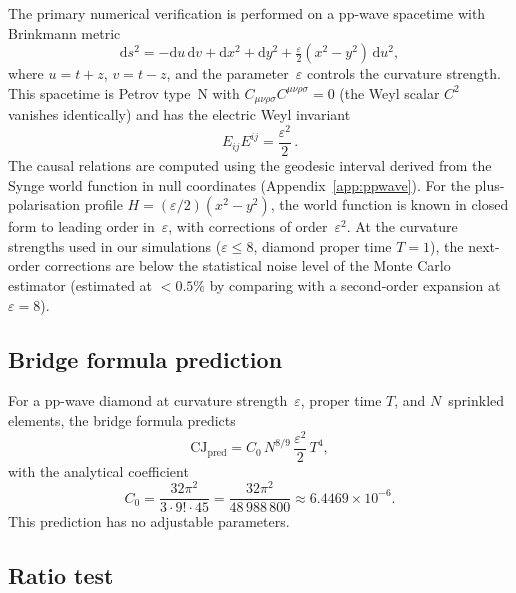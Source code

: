 \documentclass[12pt,a4paper]{article}
\theoremstyle{plain}
\theoremstyle{definition}
\theoremstyle{remark}
\newcommand{\dd}{\mathrm{d}}
\newcommand{\Esq}{E_{ij}E^{ij}}
\newcommand{\CJ}{\mathrm{CJ}}
\begin{document}
The primary numerical verification is performed on a pp-wave
spacetime with Brinkmann metric
\begin{equation}\label{eq:ppwave}
  \dd s^2 = -\dd u\,\dd v + \dd x^2 + \dd y^2
  + \tfrac{\varepsilon}{2}(x^2 - y^2)\,\dd u^2,
\end{equation}
where $u = t+z$, $v = t-z$, and the parameter~$\varepsilon$
controls the curvature strength.  This spacetime is Petrov
type~N with $C_{\mu\nu\rho\sigma}C^{\mu\nu\rho\sigma} = 0$
(the Weyl scalar $C^2$ vanishes identically) and has the
electric Weyl invariant~\cite{Wang:2019}
\begin{equation}\label{eq:E2ppw}
  \Esq = \frac{\varepsilon^2}{2}\,.
\end{equation}
The causal relations are computed using the geodesic interval
derived from the Synge world function in null coordinates
(Appendix~\ref{app:ppwave}).  For the plus-polarisation profile
$H = (\varepsilon/2)(x^2 - y^2)$, the world function is known
in closed form to leading order in~$\varepsilon$, with corrections
of order~$\varepsilon^2$.  At the curvature strengths used in our
simulations ($\varepsilon \leq 8$, diamond proper time $T = 1$),
the next-order corrections are below the statistical noise level
of the Monte Carlo estimator (estimated at $< 0.5\%$ by comparing
with a second-order expansion at $\varepsilon = 8$).

\subsection{Bridge formula prediction}
\label{sec:prediction}

For a pp-wave diamond at curvature strength~$\varepsilon$, proper
time $T$, and $N$~sprinkled elements, the bridge formula
predicts
\begin{equation}\label{eq:CJ-pred}
  \CJ_{\mathrm{pred}} = C_0\, N^{8/9}\, \frac{\varepsilon^2}{2}\, T^4,
\end{equation}
with the analytical coefficient
\begin{equation}\label{eq:C0-value}
  C_0 = \frac{32\pi^2}{3 \cdot 9! \cdot 45}
  = \frac{32\pi^2}{48\,988\,800}
  \approx 6.4469 \times 10^{-6}.
\end{equation}
This prediction has no adjustable parameters.

\subsection{Ratio test}
\label{sec:ratio}
\end{document}
